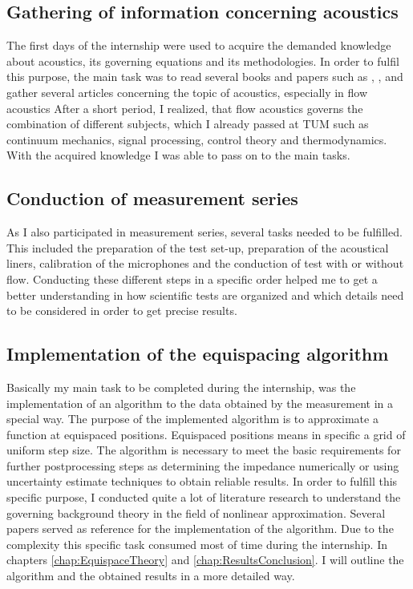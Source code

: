 \documentclass[11pt]{report} %
\begin{document}
\subsection{Gathering of information concerning acoustics } 
The first days of the internship were used to acquire the demanded knowledge about acoustics, its governing equations and its methodologies.
In order to fulfil this purpose, the main task was to read several books and papers such as \cite{Abom2010}, \cite{Elnady2004},  and gather several articles concerning the topic of acoustics, especially in flow acoustics \cite{Peter2011} \cite{Kabral2017} 
After a short period, I realized, that flow acoustics governs the combination of different subjects, which I already passed at TUM such as continuum mechanics, signal processing, control theory and thermodynamics.
With the acquired knowledge I was able to pass on to the main tasks. 

\subsection{Conduction of measurement series}
As I also participated in measurement series, several tasks needed to be fulfilled.
This included the preparation of the test set-up, preparation of the acoustical liners, calibration of the microphones and the conduction of test with or without flow.
Conducting these different steps in a specific order helped me to get a better understanding in how scientific tests are organized and which details need to be considered in order to get precise results. 

\subsection{Implementation of the equispacing algorithm}
Basically my main task to be completed during the internship, was the implementation of an algorithm to  the data obtained by the measurement in a special way. 
The purpose of the implemented algorithm is to approximate a function at equispaced positions. 
Equispaced positions means in specific a grid of uniform step size. 
The algorithm is necessary to meet the basic requirements for further postprocessing steps as determining the impedance numerically or using uncertainty estimate techniques to obtain reliable results.  
In order to fulfill this specific purpose, I conducted quite a lot of literature research to understand the governing background theory in the field of nonlinear approximation.
Several papers served as reference for the implementation of the algorithm. 
Due to the complexity this specific task consumed most of time during the internship.
In chapters \ref{chap:EquispaceTheory}  and \ref{chap:ResultsConclusion}. I will outline the algorithm and the obtained results in a more detailed way. 
\end{document}
